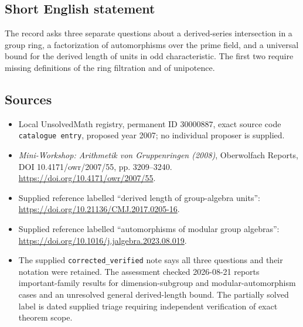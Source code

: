 \documentclass[11pt]{article}
\begin{document}
\subsection{Short English statement}
The record asks three separate questions about a derived-series intersection in a group ring, a factorization of automorphisms over the prime field, and a universal bound for the derived length of units in odd characteristic. The first two require missing definitions of the ring filtration and of unipotence.
\subsection{Sources}
\begin{itemize}
\item Local UnsolvedMath registry, permanent ID \(30000887\), exact source code \texttt{catalogue entry}, proposed year 2007; no individual proposer is supplied.
\item \emph{Mini-Workshop: Arithmetik von Gruppenringen (2008)}, Oberwolfach Reports, DOI 10.4171/owr/2007/55, pp. 3209--3240. \url{https://doi.org/10.4171/owr/2007/55}.
\item Supplied reference labelled ``derived length of group-algebra units'': \url{https://doi.org/10.21136/CMJ.2017.0205-16}.
\item Supplied reference labelled ``automorphisms of modular group algebras'': \url{https://doi.org/10.1016/j.jalgebra.2023.08.019}.
\item The supplied \texttt{corrected\_verified} note says all three questions and their notation were retained. The assessment checked 2026-08-21 reports important-family results for dimension-subgroup and modular-automorphism cases and an unresolved general derived-length bound. The partially solved label is dated supplied triage requiring independent verification of exact theorem scope.
\end{itemize}
\end{document}
